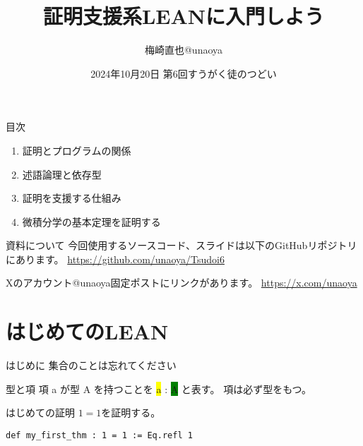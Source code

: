 \documentclass[unicode,12pt]{beamer}%
\title{証明支援系LEANに入門しよう}
\author{梅崎直也@unaoya}
\date{2024年10月20日 第6回すうがく徒のつどい}
\newcommand{\type}[1]{\colorbox{green}{#1}}
\newcommand{\term}[1]{\colorbox{yellow}{#1}}
\begin{document}
\begin{frame}
  \maketitle
\end{frame}

\begin{frame}{目次}
  \begin{enumerate}
    \item 証明とプログラムの関係
    \item 述語論理と依存型
    \item 証明を支援する仕組み
    \item 微積分学の基本定理を証明する
  \end{enumerate}
\end{frame}

\begin{frame}{資料について}
  今回使用するソースコード、スライドは以下のGitHubリポジトリにあります。
  \url{https://github.com/unaoya/Tsudoi6}

  Xのアカウント@unaoya固定ポストにリンクがあります。
  \url{https://x.com/unaoya}
\end{frame}

\section{はじめてのLEAN}

\begin{frame}{はじめに}
  \large{集合のことは忘れてください}
\end{frame}

\begin{frame}{型と項}
  項 a が型 A を持つことを \term{a} : \type{A} と表す。
  項は必ず型をもつ。
\end{frame}

\begin{frame}[fragile]{はじめての証明}
  $1=1$を証明する。

  \begin{tcolorbox}[title=FirstTheorem.lean]
  \setlength{\baselineskip}{12pt}
  \begin{Verbatim}[commandchars=\\\{\}]
def my_first_thm : 1 = 1 := Eq.refl 1
  \end{Verbatim}
  \end{tcolorbox}
\end{frame}
\end{document}
